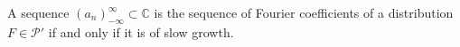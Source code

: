 \begin{theorem}
A sequence $(a_n)_{-\infty}^{\infty} \subset \mathbb{C}$ is the sequence of Fourier coefficients of a distribution $F \in \mathcal{P}'$ if and only if it is of slow growth.
\end{theorem}
